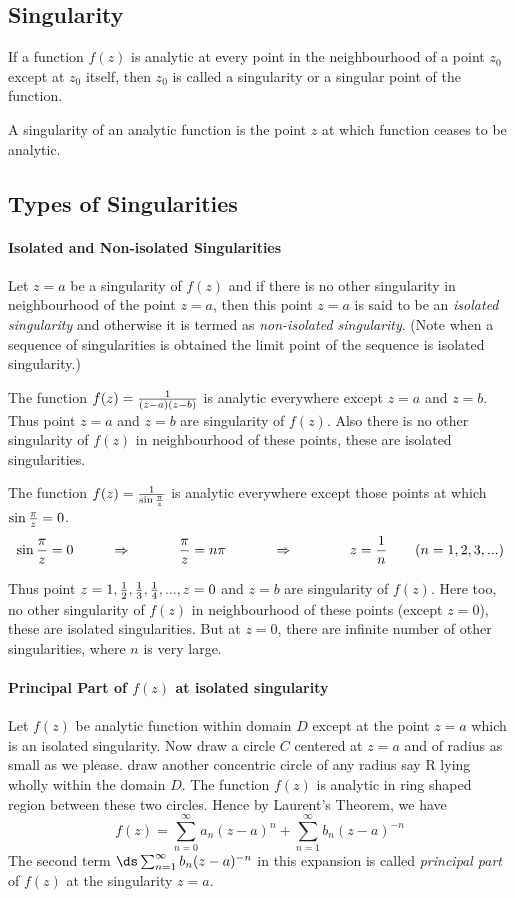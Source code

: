 \subsection{Singularity}
\begin{df}
If a function $f(z)$ is analytic at every point in the neighbourhood of a point $z_0$ except at $z_0$ itself, then $z_0$ is called a singularity or a singular point of the function.
\end{df}
A singularity of an analytic function is the point $z$ at which function ceases to be analytic. 
 \subsection{Types of Singularities}
 \paragraph{Isolated and Non-isolated Singularities}
Let $z=a$ be a singularity of $f(z)$ and if there is no other  singularity in neighbourhood of the point $z=a$, then this point $z=a$ is said to be an \textit{isolated singularity} and otherwise it is termed as \textit{non-isolated singularity}. (Note when a sequence of singularities is obtained the limit point of the sequence is isolated singularity.)
\begin{example}
The function $f(z) = {1 \over (z-a)(z-b)}$ is analytic everywhere except $z=a$ and $z=b$. Thus point $z= a$ and $z=b$ are singularity of $f(z)$. Also there is no other singularity of $f(z)$ in neighbourhood of these points, these are isolated singularities.
\end{example}
\begin{example}
The function $f(z) = {1 \over \sin {\pi \over z}}$ is analytic everywhere except those points at which $\sin {\pi \over z} = 0$.
\[\sin {\pi \over z} = 0~~~~~~~~\Rightarrow~~~~~~~~~~{\pi \over z} = n \pi ~~~~~~~~~~\Rightarrow~~~~~~~~~~~~ z = {1 \over n} ~~~~~~(n = 1, 2, 3, ...)\]

 Thus point $z= 1, {1 \over 2}, {1 \over 3}, {1 \over 4}, ..., z=0$ and $z=b$ are singularity of $f(z)$. Here too, no other singularity of $f(z)$ in neighbourhood of these points (except $z=0$), these are isolated singularities. But at $z=0$, there are infinite number of other singularities, where $n$ is very large.
 \end{example}
 \paragraph{Principal Part of $f(z)$ at isolated singularity}
 Let $f(z)$ be analytic function  within domain $D$ except at the point $z=a$ which is an isolated singularity. Now draw a circle $C$ centered at $z=a$ and of radius as small as we please. draw another concentric circle of any radius say R lying wholly within the domain $D$. The function $f(z)$ is analytic in ring shaped region between these two circles. Hence by Laurent's Theorem, we have
 \[f(z) = \sum_{n=0}^{\infty} a_n (z-a)^n + \sum_{n=1}^{\infty} b_n (z-a)^{-n}\]
 The second term $\ds \sum_{n=1}^{\infty} b_n (z-a)^{-n}$ in this expansion is called \textit{principal part} of $f(z)$ at the singularity $z=a$.
  
